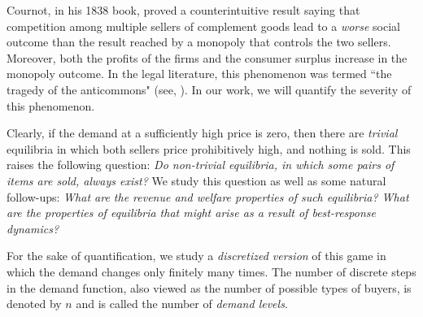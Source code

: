 Cournot, in his 1838 book, proved a counterintuitive result saying that
competition among multiple sellers of complement goods lead to a \emph{worse} social outcome than the result reached by a monopoly that controls the two sellers. Moreover, both the profits of the firms and the consumer surplus increase in the monopoly outcome.
In the legal literature, this phenomenon was termed ``the tragedy of the anticommons" (see, \cite{BY00,Hel98,PSD05}). In our work, we will quantify the severity of this phenomenon.

%

Clearly, if the demand at a sufficiently high price is zero,
then there are {\em trivial} equilibria in which both sellers
price prohibitively high, and nothing is sold.
This raises the following question: {\em Do non-trivial equilibria, in which some pairs of items are sold, always exist? }
We study this question as well as some natural follow-ups:
{\em What are the revenue and welfare properties of such equilibria?
What are the properties of equilibria that might arise as a result of best-response dynamics?}




For the sake of quantification, we study a {\em discretized version} of this game in which the demand changes only finitely many times.
The number of discrete steps in the demand function, also viewed as the number of possible types of buyers,
is denoted by $n$ and is called the number of {\em demand levels}.


